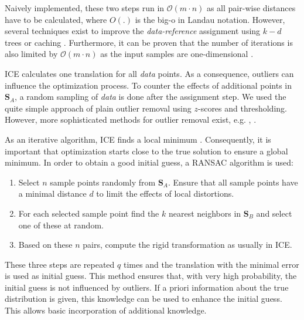 \documentclass[conference]{IEEEtran}
\theoremstyle{examplestyle}
\begin{document}
Naively implemented, these two steps run in \(\mathcal{O}(m \cdot n)\) as all pair-wise distances have to be calculated, where $O(.)$ is the big-o in Landau notation. However, several techniques exist to improve the \textit{data-reference} assignment using \(k-d\) trees or caching \cite{Pomerleau2015}. Furthermore, it can be proven that the number of iterations is also limited by \(\mathcal{O}(m \cdot n)\) as the input samples are one-dimensional \cite{Ezra2008}.

\ac{ICE} calculates one translation for all \textit{data} points. As a consequence, outliers can influence the optimization process. To counter the effects of additional points in \(\pmb{S}_A\), a random sampling of \textit{data} is done after the assignment step. We used the quite simple approach of plain outlier removal using \(z\)-scores and thresholding. However, more sophisticated methods for outlier removal exist, e.g. \cite{Hontani2012}, \cite{Phillips2007}.


As an iterative algorithm, \ac{ICE} finds a local minimum \cite{Do2008}. Consequently, it is important that optimization starts close to the true solution to ensure a global minimum. In order to obtain a good initial guess, a \ac{RANSAC} \cite{Fischler1981} algorithm is used:
\begin{enumerate}
	\item Select \(n\) sample points randomly from \(\pmb{S}_A\). Ensure that all sample points have a minimal distance \(d\) to limit the effects of local distortions.
	\item For each selected sample point find the \(k\) nearest neighbors in \(\pmb{S}_B\) and select one of these at random.
	\item Based on these \(n\) pairs, compute the rigid transformation as usually in \ac{ICE}.
\end{enumerate}

These three steps are repeated \(q\) times and the translation with the minimal error is used as initial guess. This method ensures that, with very high probability, the initial guess is not influenced by outliers. If a priori information about the true distribution is given, this knowledge can be used to enhance the initial guess. This allows basic incorporation of additional knowledge.
\end{document}
